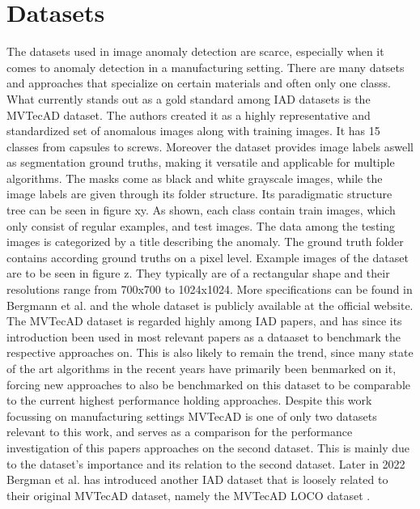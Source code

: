 \section{Datasets}
\label{sec:datasets}
The datasets used in image anomaly detection are scarce, especially when it comes to anomaly detection in a manufacturing setting. There are many datsets and approaches that specialize on certain materials \cite{FabricDataset_Tsang_2016} 
\cite{SteeltubeDataset_Yang_2021} \cite{magnetictiles_Huang_2018}
and often only one classs. What currently stands out as a gold standard among IAD datasets is the MVTecAD \cite{MVTEC_Bergmann_2021} dataset. The authors created it  
as a highly representative and standardized set of anomalous images along with training images. It has 15 classes from capsules to screws. Moreover the dataset provides image labels aswell as segmentation 
ground truths, making it versatile and applicable for multiple algorithms. The masks come as black and white grayscale images, while the image labels are given through its folder structure. 
Its paradigmatic structure tree can be seen in figure xy. As shown, each class contain train images, which only consist of regular examples, 
and test images. The data among the testing images is categorized by a title describing the anomaly. The ground truth folder contains 
according ground truths on a pixel level. Example images of the dataset are to be seen in figure z. They typically are of a rectangular shape and their resolutions range from 
700x700 to 1024x1024. More specifications can be found in Bergmann et al. \cite{MVTEC_Bergmann_2021} and the whole dataset is publicly available at the official website\cite{mvtecdownload}.\newline
The MVTecAD\cite{MVTEC_Bergmann_2021} dataset is regarded highly among IAD papers, and has since its introduction been used in most relevant papers as a dataaset 
to benchmark the respective approaches on. This is also likely to remain the trend, since many state of the art algorithms in the recent years have primarily been benmarked on it, forcing new approaches 
to also be benchmarked on this dataset to be comparable to the current highest performance holding approaches. Despite this work focussing on manufacturing settings MVTecAD is one of only two datasets relevant to this work, 
and serves as a comparison for the performance investigation of this papers approaches on the second dataset. This is mainly due to the dataset's importance and 
its relation to the second dataset.
\newline
Later in 2022 Bergman et al. has introduced another IAD dataset that is loosely related to their original MVTecAD dataset, namely the MVTecAD LOCO dataset \cite{LOCODentsAndScratchesBergmann2022}. 
